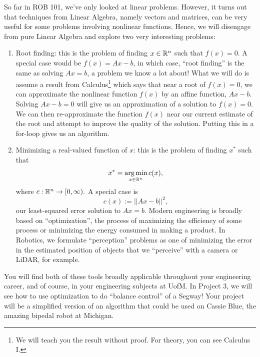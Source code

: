 So far in ROB 101, we've only looked at linear problems. However, it turns out that techniques from Linear Algebra, namely vectors and matrices, can be very useful for some problems involving nonlinear functions. Hence, we will disengage from pure Linear Algebra and explore two very interesting problems:
\begin{enumerate}
    \item Root finding: this is the problem of finding $x\in \mathbb R^n$ such that $f(x)=0.$ A special case would be $f(x) = A x-b$, in which case, ``root finding'' is the same as solving $Ax=b$, a problem we know a lot about! What we will do is assume a result from Calculus\footnote{We will teach you the result without proof. For theory, you can see Calculus I.} which says that near a root of $f(x)=0$, we can approximate the nonlinear function $f(x)$ by an affine function, $Ax-b$. Solving $Ax-b=0$ will give us an approximation of a solution to $f(x)=0$. We can then re-approximate the function $f(x)$ near our current estimate of the root and attempt to improve the quality of the solution. Putting this in a for-loop gives us an algorithm.
    
    \item Minimizing a real-valued function of $x$: this is the problem of finding $x^\ast$ such that 
    $$x^\ast = \operatorname*{arg\,min}_{x \in \mathbb R^n} c(x), $$
    where $c:\mathbb R^n \to [0, \infty).$ A special case is 
    $$c(x):= ||Ax-b||^2,$$
    our least-squared error solution to $Ax=b$. Modern engineering is broadly based on ``optimization'', the process of maximizing the efficiency of some process or minimizing the energy consumed in making a product. In Robotics, we formulate ``perception'' problems as one of minimizing the error in the estimated position of objects that we ``perceive'' with a camera or LiDAR, for example. 
\end{enumerate}
You will find both of these tools broadly applicable throughout your engineering career, and of course, in your engineering subjects at UofM. In Project 3, we will see how to use optimization to do ``balance control'' of a Segway! Your project will be a simplified version of an algorithm that could be used on Cassie Blue, the amazing bipedal robot at Michigan.